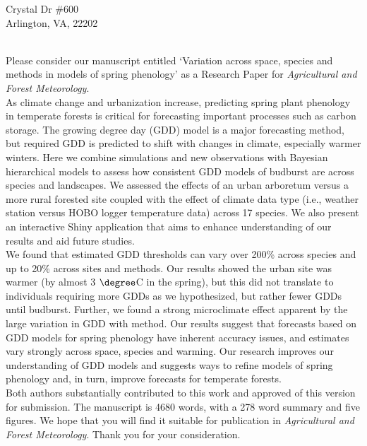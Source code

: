 \documentclass[11pt,a4paper]{article}\usepackage[]{graphicx}\usepackage[]{color}
\begin{document}
 Crystal Dr \#600\\
\noindent Arlington, VA, 22202\\

\vspace{1.5ex}


\vspace{3ex}\\
\noindent Please consider our manuscript entitled `Variation across space, species and methods in models of spring phenology' as a Research Paper for \textit{Agricultural and Forest Meteorology}. \\

\noindent As climate change and urbanization increase, predicting spring plant phenology in temperate forests is critical for forecasting important processes such as carbon storage. The growing degree day (GDD) model is a major forecasting method, but required GDD is predicted to shift with changes in climate, especially warmer winters. Here we combine simulations and new observations with Bayesian hierarchical models to assess how consistent GDD models of budburst are across species and landscapes. We assessed the effects of an urban arboretum versus a more rural forested site coupled with the effect of climate data type (i.e., weather station versus HOBO logger temperature data) across 17 species. We also present an interactive Shiny application that aims to enhance understanding of our results and aid future studies. \\

\noindent We found that estimated GDD thresholds can vary over 200\% across species and up to 20\% across sites and methods. Our results showed the urban site was warmer (by almost 3 $\degree$C in the spring), but this did not translate to individuals requiring more GDDs as we hypothesized, but rather fewer GDDs until budburst. Further, we found a strong microclimate effect apparent by the large variation in GDD with method. Our results suggest that forecasts based on GDD models for spring phenology have inherent accuracy issues, and estimates vary strongly across space, species and warming. Our research improves our understanding of GDD models and suggests ways to refine models of spring phenology and, in turn, improve forecasts for temperate forests. \\

\noindent Both authors substantially contributed to this work and approved of this version for submission. The manuscript is 4680 words, with a 278 word summary and five figures. We hope that you will find it suitable for publication in \textit{Agricultural and Forest Meteorology}. Thank you for your consideration. \\
\end{document}
